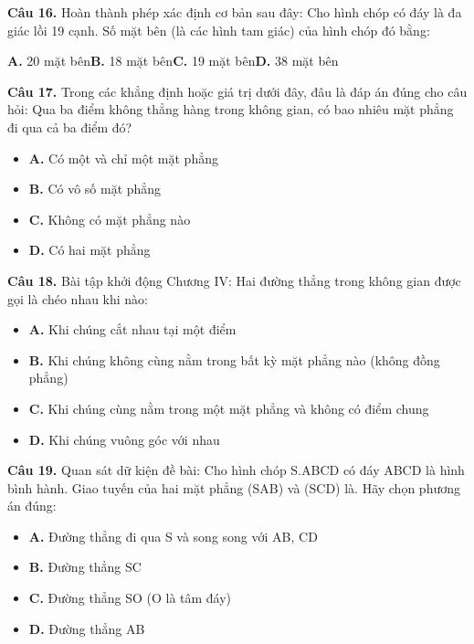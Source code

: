 \documentclass[11pt,a4paper]{article}
\begin{document}
\textbf{\color{primary} Câu 16.} Hoàn thành phép xác định cơ bản sau đây: Cho hình chóp có đáy là đa giác lồi 19 cạnh. Số mặt bên (là các hình tam giác) của hình chóp đó bằng:\par
\hspace*{1.5em}\textbf{A.} 20 mặt bên\quad\quad \textbf{B.} 18 mặt bên\quad\quad \textbf{C.} 19 mặt bên\quad\quad \textbf{D.} 38 mặt bên\par\vspace{2pt}
\textbf{\color{primary} Câu 17.} Trong các khẳng định hoặc giá trị dưới đây, đâu là đáp án đúng cho câu hỏi: Qua ba điểm không thẳng hàng trong không gian, có bao nhiêu mặt phẳng đi qua cả ba điểm đó?\par
\begin{itemize}\setlength{\itemsep}{1pt}\setlength{\parskip}{0pt}
  \item[] \textbf{A.} Có một và chỉ một mặt phẳng
  \item[] \textbf{B.} Có vô số mặt phẳng
  \item[] \textbf{C.} Không có mặt phẳng nào
  \item[] \textbf{D.} Có hai mặt phẳng
\end{itemize}\vspace{2pt}
\textbf{\color{primary} Câu 18.} Bài tập khởi động Chương IV: Hai đường thẳng trong không gian được gọi là chéo nhau khi nào:\par
\begin{itemize}\setlength{\itemsep}{1pt}\setlength{\parskip}{0pt}
  \item[] \textbf{A.} Khi chúng cắt nhau tại một điểm
  \item[] \textbf{B.} Khi chúng không cùng nằm trong bất kỳ mặt phẳng nào (không đồng phẳng)
  \item[] \textbf{C.} Khi chúng cùng nằm trong một mặt phẳng và không có điểm chung
  \item[] \textbf{D.} Khi chúng vuông góc với nhau
\end{itemize}\vspace{2pt}
\textbf{\color{primary} Câu 19.} Quan sát dữ kiện đề bài: Cho hình chóp S.ABCD có đáy ABCD là hình bình hành. Giao tuyến của hai mặt phẳng (SAB) và (SCD) là. Hãy chọn phương án đúng:\par
\begin{itemize}\setlength{\itemsep}{1pt}\setlength{\parskip}{0pt}
  \item[] \textbf{A.} Đường thẳng đi qua S và song song với AB, CD
  \item[] \textbf{B.} Đường thẳng SC
  \item[] \textbf{C.} Đường thẳng SO (O là tâm đáy)
  \item[] \textbf{D.} Đường thẳng AB
\end{itemize}\vspace{2pt}
\end{document}

